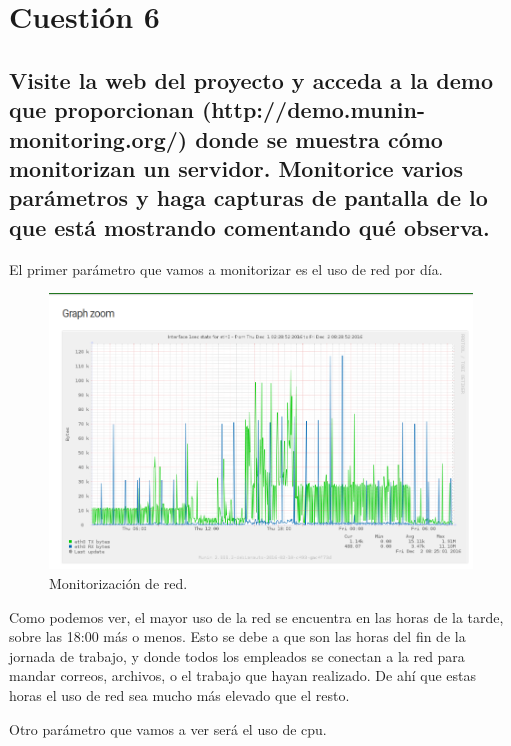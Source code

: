 \section{Cuestión 6}

\subsection{\Large Visite la web del proyecto y acceda a la demo que proporcionan (http://demo.munin-monitoring.org/) donde se muestra cómo monitorizan un servidor. Monitorice varios parámetros y haga capturas de pantalla de lo que está mostrando comentando qué observa.}

El primer parámetro que vamos a monitorizar es el uso de red por día.

\begin{figure}[H] %
	\centering
	\includegraphics[scale=0.5]{imagenes/uso-red.png}  %
	\caption{Monitorización de red.}
\end{figure}

Como podemos ver, el mayor uso de la red se encuentra en las horas de la tarde, sobre las 18:00 más o menos. Esto se debe a que son las horas del fin de la jornada de trabajo, y donde todos los empleados se conectan a la red para mandar correos, archivos, o el trabajo que hayan realizado. De ahí que estas horas el uso de red sea mucho más elevado que el resto.

Otro parámetro que vamos a ver será el uso de cpu.

